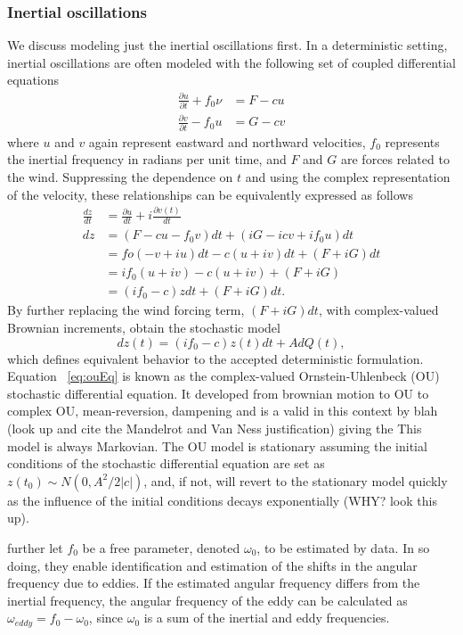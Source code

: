 \documentclass{stat572Style}
\begin{document}
\subsubsection{Inertial oscillations}
We discuss modeling just the inertial oscillations first. In a deterministic setting, inertial oscillations are often modeled with the following set of coupled differential equations \citep{Pollard1970}
\begin{align}
\frac{\partial u }{\partial t}  + f_{0} \nu &= F - cu \\ \nonumber
\frac{\partial v}{\partial t} - f_{0}u &= G - cv
\end{align}
where $u$ and $v$ again represent eastward and northward velocities, $f_{0}$ represents the inertial frequency in radians per unit time, and $F$ and $G$ are forces related to the wind. Suppressing the dependence on $t$ and using the complex representation of the velocity, these relationships can be equivalently expressed as follows
\begin{align*}
\label{eq:diffEqDeriv}
\frac{dz}{dt} &= \frac{\partial u}{dt} + i\frac{\partial v(t)}{dt}\\
dz &= (F - c u- f_{0}v)dt + (iG - icv + if_{0}u)dt\\
&= fo(-v + iu)dt - c(u + iv)dt + (F + iG)dt\\
&= if_{0}(u + iv) - c(u + iv) + (F + iG)\\
&= (if_{0} - c)z dt + (F + iG)dt. 
\end{align*}
By further replacing the wind forcing term, $(F + iG)dt$, with complex-valued Brownian increments, \citet{Sykulski2016} obtain the stochastic model 
\begin{equation}
\label{eq:ouEq}
dz(t) = (i f_{0} -c) z(t) dt + A d Q(t), 
\end{equation}
which defines equivalent behavior to the accepted deterministic formulation. Equation ~\ref{eq:ouEq}  is known as the complex-valued Ornstein-Uhlenbeck (OU) stochastic differential equation. It developed from brownian motion to OU to complex OU, mean-reversion, dampening and is a valid in this context by  blah (look up and cite the Mandelrot and Van Ness justification) giving the This model is always Markovian. The OU model is stationary assuming the initial conditions of the stochastic differential equation are set as $z(t_{0}) \sim N(0, A^{2}/2|c|)$, and, if not, will revert to the stationary model quickly as the influence of the initial conditions decays exponentially (WHY? look this up). 

\citet{Sykulski2016} further let $f_{0}$ be a free parameter, denoted $\omega_{0}$, to be estimated by data. In so doing, they enable  identification and estimation of the shifts in the angular frequency due to eddies. If the estimated angular frequency differs from the inertial frequency, the angular frequency of the eddy can be calculated as $\omega_{eddy} = f_{0} - \omega_{0}$, since $\omega_{0}$ is a sum of the inertial and eddy frequencies.
\end{document}
